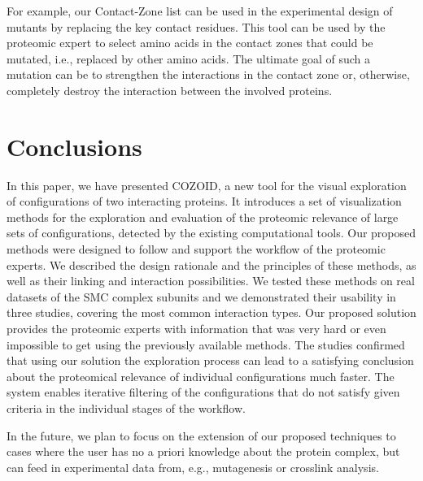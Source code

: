 \documentclass{bmcart}
\def\CoZoList{Contact-Zone list\xspace}
\begin{document}
For example, our \CoZoList can be used in the experimental design of mutants by replacing the key contact residues. 
This tool can be used by the proteomic expert to select amino acids in the contact zones that could be mutated, i.e., replaced by other amino acids.
The ultimate goal of such a mutation can be to strengthen the interactions in the contact zone or, otherwise, completely destroy the interaction between the involved proteins. 


\section*{Conclusions}
In this paper, we have presented COZOID, a new tool for the visual exploration of configurations of two interacting proteins. 
It introduces a set of visualization methods for the exploration and evaluation of the proteomic relevance of large sets of configurations, detected by the existing computational tools.
Our proposed methods were designed to follow and support the workflow of the proteomic experts.
We described the design rationale and the principles of these methods, as well as their linking and interaction possibilities. 
We tested these methods on real datasets of the SMC complex subunits and we demonstrated their usability in three studies, covering the most common interaction types.
Our proposed solution provides the proteomic experts with information that was very hard or even impossible to get using the previously available methods.
The studies confirmed that using our solution the exploration process can lead to a satisfying conclusion about the proteomical relevance of individual configurations much faster.
The system enables iterative filtering of the configurations that do not satisfy given criteria in the individual stages of the workflow.

In the future, we plan to focus on the extension of our proposed techniques to cases where the user has no a priori knowledge about the protein complex, but can feed in experimental data from, e.g., mutagenesis or crosslink analysis.
\end{document}
